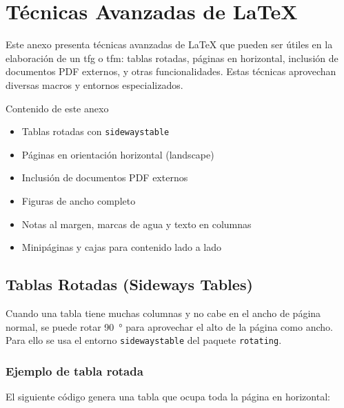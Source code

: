 \chapter{Técnicas Avanzadas de \LaTeX}
\label{anexo:tecnicas-avanzadas}

Este anexo presenta técnicas avanzadas de \LaTeX{} que pueden ser útiles en la
elaboración de un \gls{tfg} o \gls{tfm}: tablas rotadas, páginas en horizontal,
inclusión de documentos PDF externos, y otras funcionalidades. Estas técnicas
aprovechan diversas \glspl{macro} y \glspl{entorno} especializados.

\begin{infobox}{Contenido de este anexo}
  \begin{itemize}
    \item Tablas rotadas con \texttt{sidewaystable}
    \item Páginas en orientación horizontal (landscape)
    \item Inclusión de documentos PDF externos
    \item Figuras de ancho completo
    \item Notas al margen, marcas de agua y texto en columnas
    \item Minipáginas y cajas para contenido lado a lado
  \end{itemize}
\end{infobox}

\section{Tablas Rotadas (Sideways Tables)}
\label{sec:tablas-rotadas}

Cuando una tabla tiene muchas columnas y no cabe en el ancho de página normal,
se puede rotar \qty{90}{\degree} para aprovechar el alto de la página como ancho.
Para ello se usa el entorno \texttt{sidewaystable} del paquete \texttt{rotating}.

\subsection{Ejemplo de tabla rotada}
\label{subsec:ejemplo-tabla-rotada}

El siguiente código genera una tabla que ocupa toda la página en horizontal:

